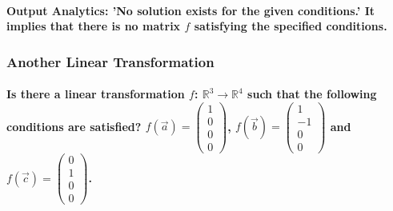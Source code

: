 \paragraph{\textbf{Output Analytics: 'No solution exists for the given conditions.'}  It implies that there is no matrix $f$ satisfying the specified conditions.}
% 
% 
% 
% 

\subsubsection{Another Linear Transformation}
\paragraph{Is there a linear transformation $f$: $\mathbb{R}^{3} \rightarrow \mathbb{R}^{4}$ such that the following conditions are satisfied?
    $ f(\vec{a})= \begin{pmatrix}
            1 \\
            0 \\
            0 \\
            0
        \end{pmatrix}$,
    $ f(\vec{b})= \begin{pmatrix}
            1  \\
            -1 \\
            0  \\
            0
        \end{pmatrix}$ and
    $ f(\vec{c})= \begin{pmatrix}
            0 \\
            1 \\
            0 \\
            0
        \end{pmatrix}$.}
